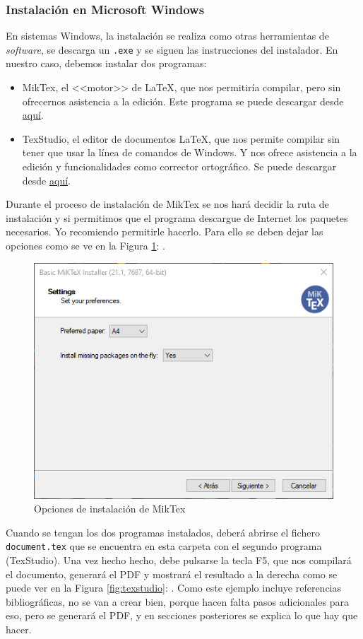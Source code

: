 \documentclass[a4paper]{article}
\begin{document}
\subsubsection{Instalación en Microsoft Windows}
En sistemas Windows, la instalación se realiza como otras herramientas de
\textit{software}, se descarga un \texttt{.exe} y se siguen las instrucciones
del instalador. En nuestro caso, debemos instalar dos programas:
\begin{itemize}
    \item MikTex, el <<motor>> de \LaTeX{}, que nos permitiría compilar,
pero sin ofrecernos asistencia a la edición.
Este programa se puede descargar desde \href{https://miktex.org/download}{aquí}. 
    \item TexStudio, el editor de documentos \LaTeX{}, que nos permite compilar
sin tener que usar la línea de comandos de Windows. Y nos ofrece
asistencia a la edición y funcionalidades como corrector ortográfico.
Se puede descargar desde \href{https://www.texstudio.org/}{aquí}.
\end{itemize}

Durante el proceso de
instalación de MikTex se nos hará decidir la ruta de instalación y si permitimos
que el programa descargue de Internet los paquetes necesarios. Yo
recomiendo permitirle hacerlo. Para ello se deben dejar las opciones como
se ve en la Figura \ref{fig:miktex}: .
\begin{figure}[H]
    \center
    \includegraphics[width=0.75\hsize]{miktexInstall}
    \caption{Opciones de instalación de MikTex}
    \label{fig:miktex}
\end{figure}

Cuando se tengan los dos programas instalados, deberá abrirse el fichero
\texttt{document.tex} que se encuentra en esta carpeta
con el segundo programa (TexStudio). Una vez hecho hecho, debe pulsarse la tecla
F5, que nos compilará el documento, generará el PDF y mostrará el resultado a la
derecha como se puede ver en la Figura \ref{fig:texstudio}:
. Como este ejemplo incluye referencias bibliográficas,
no se van a crear bien, porque hacen falta pasos adicionales para eso, pero
se generará el PDF, y en secciones posteriores se explica lo que hay que hacer.
\end{document}
